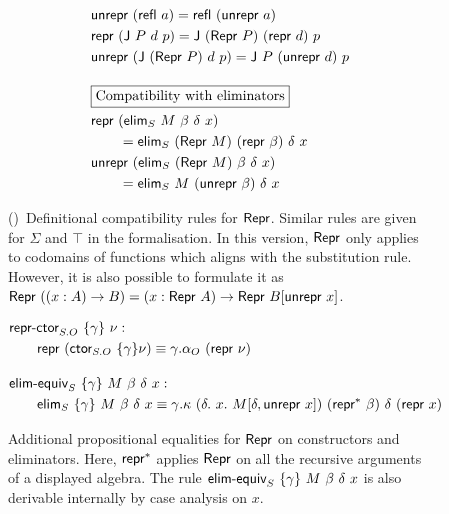 \begin{figure}[H]
\begin{minipage}[t]{0.5\textwidth}
\begin{align*}
			 & \Munrepr\ (\mta{refl}\ a)  = \mta{refl}\ (\Munrepr\ a)                        \\
			 & \Mrepr\ (\mta{J}\ P\ d\ p) = \mta{J}\ (\mta{Repr}\ P)\ (\mta{repr}\ d)\ p     \\
			 & \Munrepr\ (\mta{J}\ (\mta{Repr}\ P)\ d\ p) = \mta{J}\ P\ (\mta{unrepr}\ d)\ p \\[1em]
			 & \boxed{\text{Compatibility with eliminators}}                                 \\
			 & \Mrepr\ (\mta{elim}_S\ M\ \beta\ \delta\ x)                                   \\ &\qquad = \mta{elim}_S\ (\MRepr\ M)\ (\Mrepr\ \beta)\ \delta\ x \\
			 & \Munrepr\ (\mta{elim}_S\ (\MRepr\ M)\ \beta\ \delta\ x)                       \\ &\qquad = \mta{elim}_S\ M\ (\Munrepr\ \beta)\ \delta\ x
		\end{align*}
	\end{minipage}%
	\caption{()\
		Definitional compatibility rules for $\textsf{Repr}$. Similar rules are given for
		$\Sigma$ and $\top$ in the formalisation. In this version, $\textsf{Repr}$ only applies to codomains
		of functions which aligns with the substitution rule. However, it is also
		possible to formulate it as \\ $\textsf{Repr}\ ((x : A) \to B) = (x : \textsf{Repr}\ A) \to \textsf{Repr}\ B[\textsf{unrepr}\ x]$.}
	\label{fig:lambdaind-repr-coherence-pi-univ}
\end{figure}

\begin{figure}[H]
	\vspace{2em}
	\begin{align*}
		 & \mta{repr-ctor}_{S.O}\ \{\gamma\}\ \nu :                \\ & \qquad \Mrepr\ (\Mctor_{S.O}\ \{\gamma\} \nu) \equiv \gamma.\alpha_O\ (\Mrepr\ \nu) \\[1em]
		 & \mta{elim-equiv}_{S}\ \{\gamma\}\ M\ \beta\ \delta\ x : \\   & \qquad
		    \mta{elim}_{S}\ \{\gamma\}\ M\ \beta\ \delta\ x \equiv \gamma.\kappa\ (\delta.\ x.\ M[\delta, \Munrepr\ x])\ (\Mrepr^*\ \beta)\ \delta\ (\Mrepr\ x)
	\end{align*}
	\caption{Additional propositional equalities for $\textsf{Repr}$ on constructors and eliminators. Here, $\textsf{repr}^*$ applies $\textsf{Repr}$ on all the recursive
		arguments of a displayed algebra. The rule $\mta{elim-equiv}_{S}\ \{\gamma\}\ M\ \beta\ \delta\ x$ is also derivable internally by case analysis
		on $x$.}
\end{figure}
